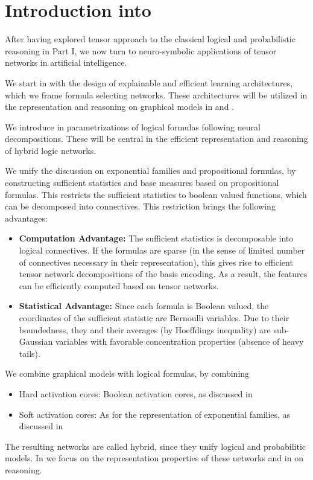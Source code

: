 \chapter{Introduction into }

After having explored tensor approach to the classical logical and probabilistic reasoning in Part I, we now turn to neuro-symbolic applications of tensor networks in artificial intelligence.

We start in  with the design of explainable and efficient learning architectures, which we frame formula selecting networks.
These architectures will be utilized in the representation and reasoning on graphical models in  and .


We introduce in  parametrizations of logical formulas following neural decompositions.
These will be central in the efficient representation and reasoning of hybrid logic networks.


We unify the discussion on exponential families and propositional formulas, by constructing sufficient statistics and base measures based on propositional formulas.
This restricts the sufficient statistics to boolean valued functions, which can be decomposed into connectives.
This restriction brings the following advantages:
\begin{itemize}
	\item \textbf{Computation Advantage:} The sufficient statistics is decomposable into logical connectives.
	If the formulas are sparse (in the sense of limited number of connectives necessary in their representation), this gives rise to efficient tensor network decompositions of the basis encoding.
    As a result, the features can be efficiently computed based on tensor networks.
    \item \textbf{Statistical Advantage:} Since each formula is Boolean valued, the coordinates of the sufficient statistic are Bernoulli variables.
	Due to their boundedness, they and their averages (by Hoeffdings inequality) are sub-Gaussian variables with favorable concentration properties (absence of heavy tails).
\end{itemize}

We combine graphical models with logical formulas, by combining
\begin{itemize}
    \item Hard activation cores: Boolean activation cores, as discussed in 
    \item Soft activation cores: As for the representation of exponential families, as discussed in 
\end{itemize}
The resulting networks are called hybrid, since they unify logical and probabilitic models.
In  we focus on the representation properties of these networks and in  on reasoning.

